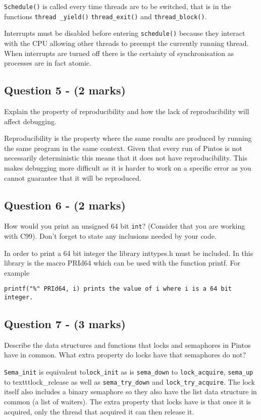 \documentclass[a4paper,12pt]{article}
\begin{document}
\texttt{Schedule()} is called every time threads are to be switched, that is in the functions \texttt{thread _yield()} \texttt{thread_exit()} and \texttt{thread_block()}.

Interrupts must be disabled before entering \texttt{schedule()} because they interact with the CPU allowing other threads to preempt the currently running thread. When interrupts are turned off there is the certainty of synchronisation as processes are in fact atomic.\\

\subsection*{Question 5 - (2 marks)}
Explain the property of reproducibility and how the lack of reproducibility will affect debugging.

Reproducibility is the property where the same results are produced by running the same program in the same context. Given that every run of Pintos is not necessarily deterministic this means that it does not have reproducibility. This makes debugging more difficult as it is harder to work on a specific error as you cannot guarantee that it will be reproduced.\\

\subsection*{Question 6 - (2 marks)}
How would you print an unsigned 64 bit \texttt{int}? 
(Consider that you are working with C99). 
Don't forget to state any inclusions needed by your code.

In order to print a 64 bit integer the library inttypes.h must be included. In this library is the macro PRId64 which can be used with the function printf. For example
	
\begin{verbatim}
printf("%" PRId64, i) prints the value of i where i is a 64 bit integer.
\end{verbatim}


\subsection*{Question 7 - (3 marks)}
Describe the data structures and functions that locks and semaphores in Pintos have in common. 
What extra property do locks have that semaphores do not?

\texttt{Sema_init} is equivalent to\texttt{lock_init} as is \texttt{sema_down} to \texttt{lock_acquire}, \texttt{sema_up} to texttt{lock_release} as well as \texttt{sema_try_down} and \texttt{lock_try_acquire}. The lock itself also includes a binary semaphore so they also have the list data structure in common (a list of waiters).
The extra property that locks have is that once it is acquired, only the thread that acquired it can then release it. \\
\end{document}
